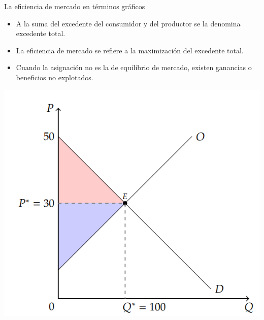 \documentclass{beamer}
\begin{document}
\begin{frame}{La eficiencia de mercado en términos gráficos}
  \begin{itemize}
    \item A la suma del excedente del consumidor y del productor se la denomina excedente total.
    \item La eficiencia de mercado se refiere a la maximización del excedente total.
    \item Cuando la asignación no es la de equilibrio de mercado, existen ganancias o beneficios no explotados.
  \end{itemize}
  \centering
  \includegraphics[scale=0.5]{../Figures/C17.9.png}
\end{frame}
\end{document}

